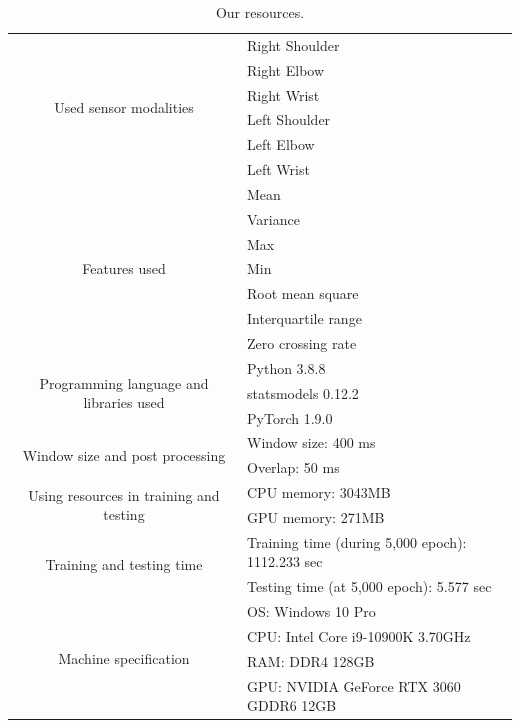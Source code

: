 \documentclass[graybox]{svmult}
\begin{document}
\begin{table}[h]
    \centering
    \caption{Our resources.}
    \begin{tabular}{c|l}\hline
    \multirow{6}{*}{Used sensor modalities} & Right Shoulder \\
    & Right Elbow \\
    & Right Wrist \\
    & Left Shoulder \\
    & Left Elbow \\
    & Left Wrist \\ \hline
    \multirow{7}{*}{Features used} & Mean \\
    & Variance \\
    & Max \\
    & Min \\
    & Root mean square \\
    & Interquartile range \\
    & Zero crossing rate \\ \hline
    \multirow{3}{*}{Programming language and libraries used} & Python 3.8.8 \\
    & statsmodels 0.12.2 \\
    & PyTorch 1.9.0 \\ \hline
    \multirow{2}{*}{Window size and post processing} & Window size: 400 ms \\
    & Overlap: 50 ms \\ \hline
    \multirow{2}{*}{Using resources in training and testing} & CPU memory: 3043MB \\
    & GPU memory: 271MB \\ \hline
    \multirow{2}{*}{Training and testing time} & Training time (during 5,000 epoch): 1112.233 sec \\
    & Testing time (at 5,000 epoch): 5.577 sec \\ \hline
    \multirow{4}{*}{Machine specification} & OS: Windows 10 Pro \\
    & CPU: Intel Core i9-10900K 3.70GHz \\
    & RAM: DDR4 128GB \\
    & GPU: NVIDIA GeForce RTX 3060 GDDR6 12GB \\ \hline
    \end{tabular}
\end{table}

\end{document}
